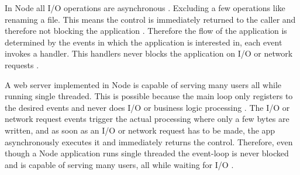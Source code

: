 In Node all I/O operations are asynchronous \cite{chaniotis2015node}. Excluding a few operations like renaming a file. This means the control is immediately returned to the caller and therefore not blocking the application \cite{tilkov2010node}. Therefore the flow of the application is determined by the events in which the application is interested in, each event invokes a handler. This handlers never blocks the application on I/O or network requests \cite{doglio2015pro}.

A web server implemented in Node is capable of serving many users all while running single threaded. This is possible because the main loop only registers to the desired events and never does I/O or business logic processing \cite{tilkov2010node}. The I/O or network request events trigger the actual processing where only a few bytes are written, and as soon as an I/O or network request has to be made, the app asynchronously executes it and immediately returns the control. Therefore, even though a Node application runs single threaded the event-loop is never blocked and is capable of serving many users, all while waiting for I/O \cite{tilkov2010node}.